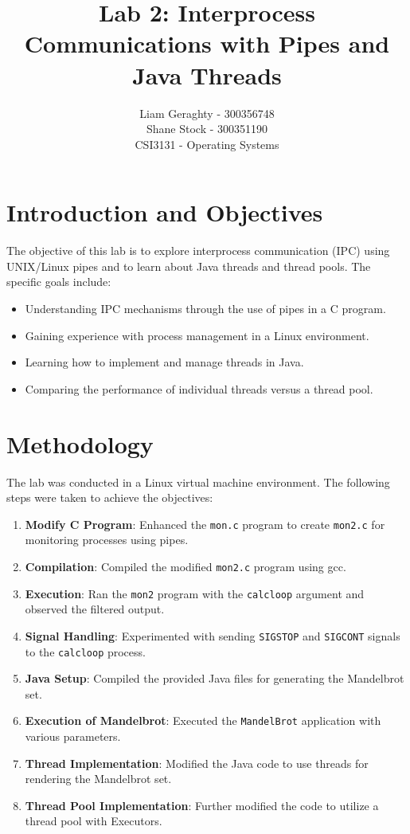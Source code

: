 \documentclass[a4paper,12pt]{article}
\title{Lab 2: Interprocess Communications with Pipes and Java Threads}
\author{Liam Geraghty - 300356748 \\ Shane Stock - 300351190 \\ CSI3131 - Operating Systems}
\begin{document}
\maketitle

\section{Introduction and Objectives}
The objective of this lab is to explore interprocess communication (IPC) using UNIX/Linux pipes and to learn about Java threads and thread pools. The specific goals include:
\begin{itemize}
    \item Understanding IPC mechanisms through the use of pipes in a C program.
    \item Gaining experience with process management in a Linux environment.
    \item Learning how to implement and manage threads in Java.
    \item Comparing the performance of individual threads versus a thread pool.
\end{itemize}

\section{Methodology}
The lab was conducted in a Linux virtual machine environment. The following steps were taken to achieve the objectives:
\begin{enumerate}
    \item \textbf{Modify C Program}: Enhanced the \texttt{mon.c} program to create \texttt{mon2.c} for monitoring processes using pipes.
    \item \textbf{Compilation}: Compiled the modified \texttt{mon2.c} program using gcc.
    \item \textbf{Execution}: Ran the \texttt{mon2} program with the \texttt{calcloop} argument and observed the filtered output.
    \item \textbf{Signal Handling}: Experimented with sending \texttt{SIGSTOP} and \texttt{SIGCONT} signals to the \texttt{calcloop} process.
    \item \textbf{Java Setup}: Compiled the provided Java files for generating the Mandelbrot set.
    \item \textbf{Execution of Mandelbrot}: Executed the \texttt{MandelBrot} application with various parameters.
    \item \textbf{Thread Implementation}: Modified the Java code to use threads for rendering the Mandelbrot set.
    \item \textbf{Thread Pool Implementation}: Further modified the code to utilize a thread pool with Executors.
\end{enumerate}
\end{document}

